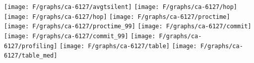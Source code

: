 

\texttt{[image: F/graphs/ca-6127/avgtsilent]}
\texttt{[image: F/graphs/ca-6127/hop]}
\texttt{[image: F/graphs/ca-6127/hop]}
\texttt{[image: F/graphs/ca-6127/proctime]}
\texttt{[image: F/graphs/ca-6127/proctime\_99]}
\texttt{[image: F/graphs/ca-6127/commit]}
\texttt{[image: F/graphs/ca-6127/commit\_99]}
\texttt{[image: F/graphs/ca-6127/profiling]}
\texttt{[image: F/graphs/ca-6127/table]}
\texttt{[image: F/graphs/ca-6127/table\_med]}
\fi
